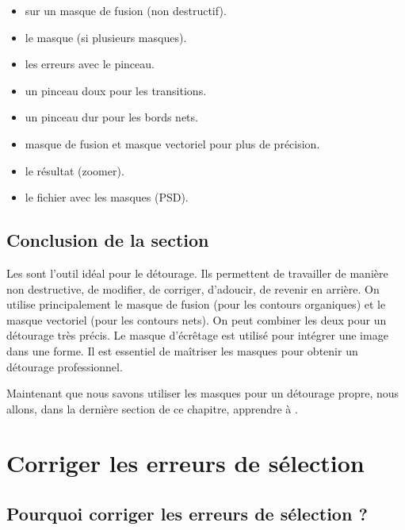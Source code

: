 \begin{itemize}
    \item {} sur un masque de fusion (non destructif).
    \item {} le masque (si plusieurs masques).
    \item {} les erreurs avec le pinceau.
    \item {} un pinceau doux pour les transitions.
    \item {} un pinceau dur pour les bords nets.
    \item {} masque de fusion et masque vectoriel pour plus de précision.
    \item {} le résultat (zoomer).
    \item {} le fichier avec les masques (PSD).
\end{itemize}

\subsection*{Conclusion de la section}

Les  sont l'outil idéal pour le détourage. Ils permettent de travailler de manière non destructive, de modifier, de corriger, d'adoucir, de revenir en arrière. On utilise principalement le masque de fusion (pour les contours organiques) et le masque vectoriel (pour les contours nets). On peut combiner les deux pour un détourage très précis. Le masque d'écrêtage est utilisé pour intégrer une image dans une forme. Il est essentiel de maîtriser les masques pour obtenir un détourage professionnel.

Maintenant que nous savons utiliser les masques pour un détourage propre, nous allons, dans la dernière section de ce chapitre, apprendre à .

\section{Corriger les erreurs de sélection}

\subsection{Pourquoi corriger les erreurs de sélection ?}

